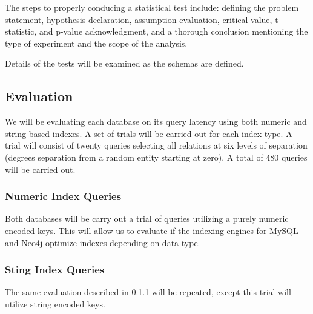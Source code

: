 \documentclass[conference]{IEEEtran}
\begin{document}
    The steps to properly conducing a statistical test include: defining the problem statement, hypothesis declaration, assumption evaluation, critical value, t-statistic, and p-value acknowledgment, and a thorough conclusion mentioning the type of experiment and the scope of the analysis.

    Details of the tests will be examined as the schemas are defined.

\subsection{Evaluation}
We will be evaluating each database on its query latency using both numeric
and string based indexes. A set of trials will be carried out for each index type. A trial will consist of twenty queries selecting all relations at six levels of separation (degrees separation from a random entity starting at zero). A total of 480 queries will be carried out.

\subsubsection{Numeric Index Queries}\label{numeric-eval}
Both databases will be carry out a trial of queries utilizing a purely numeric encoded keys. This will allow us to evaluate if the indexing engines for MySQL and Neo4j optimize indexes depending on data type.

\subsubsection{Sting Index Queries}
The same evaluation described in \ref{numeric-eval} will be repeated, except 
this trial will utilize string encoded keys.



    
\end{document}
